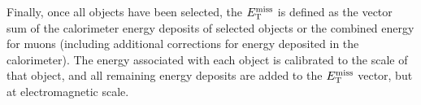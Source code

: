 Finally, once all objects have been selected, the $E_{\mathrm{T}}^{\mathrm{miss}}$ is defined as the vector sum of the calorimeter energy deposits of selected objects or the combined energy for muons (including additional corrections for energy deposited in the calorimeter).
The energy associated with each object is calibrated to the scale of that object, and all remaining energy deposits are added to the $E_{\mathrm{T}}^{\mathrm{miss}}$ vector, but at electromagnetic scale.


